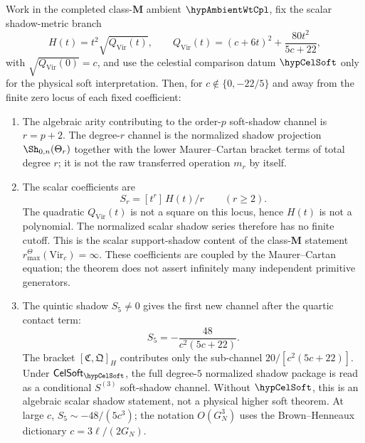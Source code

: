 \begin{theorem}
\label{thm:gravity-infinite-soft-tower}
Work in the completed class-\(\mathbf M\) ambient \(\hypAmbientWtCpl\),
fix the scalar shadow-metric branch
\[
H(t)=t^2\sqrt{Q_{\mathrm{Vir}}(t)},\qquad
Q_{\mathrm{Vir}}(t)=(c+6t)^2+\frac{80t^2}{5c+22},
\]
with \(\sqrt{Q_{\mathrm{Vir}}(0)}=c\), and use the celestial comparison
datum \(\hypCelSoft\) only for the physical soft interpretation.  Then,
for \(c\notin\{0,-22/5\}\) and away from the finite zero locus of each
fixed coefficient:
\begin{enumerate}[label=\textup{(\roman*)}]
\item The algebraic arity contributing to the order-\(p\) soft-shadow
 channel is \(r=p+2\).  The degree-\(r\) channel is the normalized
 shadow projection \(\Sh_{0,n}(\Theta_r)\) together with the lower
 Maurer--Cartan bracket terms of total degree \(r\); it is not the raw
 transferred operation \(m_r\) by itself.
\item The scalar coefficients are
 \[
 S_r=[t^r]\,H(t)/r \qquad (r\ge2).
 \]
 The quadratic \(Q_{\mathrm{Vir}}(t)\) is not a square on this locus,
 hence \(H(t)\) is not a polynomial.  The normalized scalar shadow
 series therefore has no finite cutoff.  This is the scalar
 support-shadow content of the class-\(\mathbf M\) statement
 \(r^\Theta_{\max}(\mathrm{Vir}_c)=\infty\).  These coefficients are
 coupled by the Maurer--Cartan equation; the theorem does not assert
 infinitely many independent primitive generators.
\item The quintic shadow $S_5 \neq 0$
 gives the first new channel after the quartic contact term:
 \[
 S_5=-\frac{48}{c^2(5c+22)}.
 \]
 The bracket \([\mathfrak C,\mathfrak Q]_H\) contributes only the
 sub-channel \(20/[c^2(5c+22)]\).  Under
 \(\mathsf{CelSoft}_{\hypCelSoft}\), the full degree-\(5\) normalized
 shadow package is read as a conditional \(S^{(3)}\) soft-shadow
 channel.  Without \(\hypCelSoft\), this is an algebraic scalar
 shadow statement, not a physical higher soft theorem.  At large
 \(c\), \(S_5\sim -48/(5c^3)\); the notation \(O(G_N^3)\) uses the
 Brown--Henneaux dictionary \(c=3\ell/(2G_N)\).
\end{enumerate}
\end{theorem}

